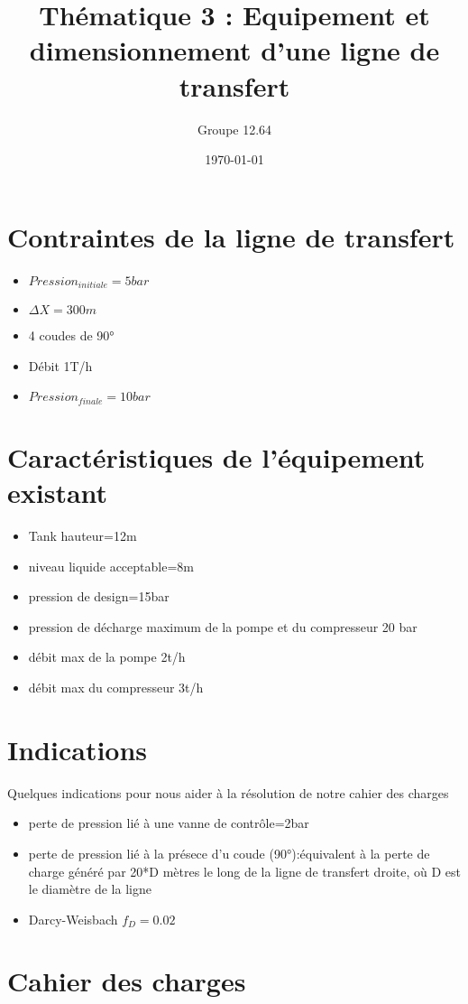 \documentclass[french, a4paper, 10pt]{article}
\title{Thématique 3 : Equipement et dimensionnement d'une ligne de transfert}
\author{Groupe 12.64}
\date{\today}
\begin{document}
\maketitle
\section{Contraintes de la ligne de transfert}
\begin{itemize}
\item $Pression_{initiale}=5bar$
\item $\Delta X=300m$
\item 4 coudes de 90°
\item Débit 1T/h
\item $Pression_{finale}=10bar$
\end{itemize}

\section{Caractéristiques de l'équipement existant}
\begin{itemize}
\item Tank hauteur=12m
\item niveau liquide acceptable=8m
\item pression de design=15bar
\item pression de décharge maximum de la pompe et du compresseur 20 bar
\item débit max de la pompe 2t/h
\item débit max du compresseur 3t/h
\end{itemize}

\section{Indications}
Quelques indications pour nous aider à la résolution de notre cahier des charges
\begin{itemize}
\item perte de pression lié à une vanne de contrôle=2bar
\item perte de pression lié à la présece d'u coude (90°):équivalent à la perte de charge généré par 20*D mètres le long de la ligne de transfert droite, où D est le diamètre de la ligne
\item Darcy-Weisbach $f_{D}=0.02$
\end{itemize}

\section{Cahier des charges}
\end{document}

